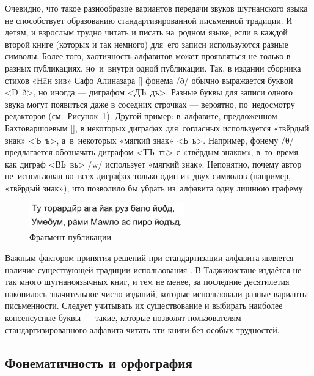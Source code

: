 Очевидно, что такое разнообразие вариантов передачи звуков шугнанского языка не способствует образованию стандартизированной письменной традиции. И детям, и взрослым трудно читать и писать на~родном языке, если в каждой второй книге (которых и так немного) для~его записи используются разные символы. Более того, хаотичность алфавитов может проявляться не только в разных публикациях, но~и~внутри одной публикации. Так, в издании сборника стихов «Нāн зив» Сафо Алиназара [\cite*{alinazar2017}] фонема /ð/ обычно выражается буквой <Ð~ð>, но иногда — диграфом <ДЪ~дъ>. Разные буквы для записи одного звука могут появиться даже в соседних строчках — вероятно, по~недосмотру редакторов (см.~Рисунок~\ref{fig:ortho1}). Другой пример: в~алфавите, предложенном Бахтоваршоевым [\cite*{bakhtovarshoev2013}], в некоторых диграфах для~согласных используется «твёрдый знак» <Ъ~ъ>, а~в~некоторых «мягкий знак» <Ь~ь>. Например, фонему /θ/ предлагается обозначать диграфом <ТЪ~тъ> с «твёрдым знаком», в~то~время как диграф <ВЬ~вь> /w/ использует «мягкий знак». Непонятно, почему автор не~использовал во~всех диграфах только один из~двух символов (например, «твёрдый знак»), что позволило бы убрать из~алфавита одну лишнюю графему.

\begin{figure}[h]
 \centering
 \caption{Фрагмент публикации \parencite[26]{alinazar2017}}
 \smallskip
 \label{fig:ortho1}
 \includegraphics[width=0.6\textwidth]{img/ortho1.jpg}
\end{figure}

Важным фактором принятия решений при стандартизации алфавита является наличие существующей традиции использования \parencites[284]{seifart2008}[6–8]{stark2010}. В Таджикистане издаётся не так много шугнаноязычных книг, и тем не менее, за последние десятилетия накопилось значительное число изданий, которые использовали разные варианты письменности. Следует учитывать их существование и выбирать наиболее консенсусные буквы — такие, которые позволят пользователям стандартизированного алфавита читать эти книги без особых трудностей.

\subsection{Фонематичность и орфография} \label{ortho-phoneme}

